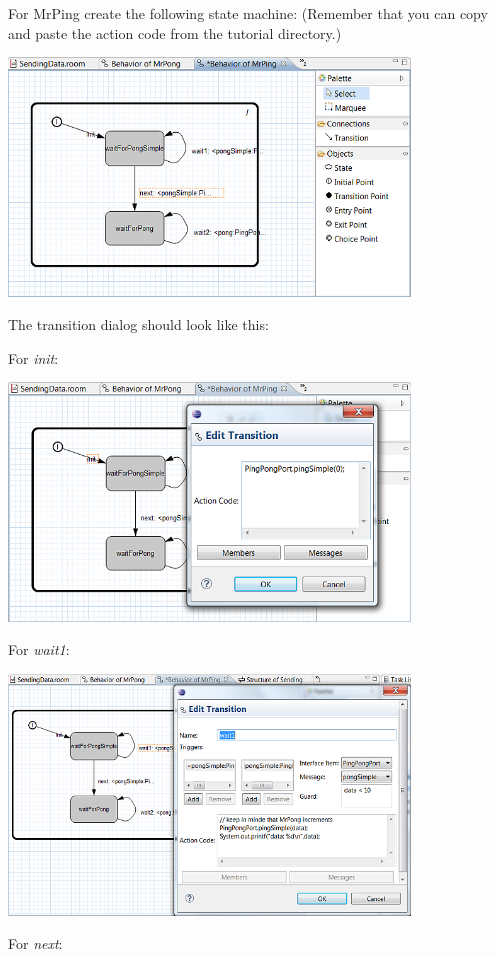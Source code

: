 For MrPing create the following state machine:
(Remember that you can copy and paste the action code from the tutorial directory.)

\includegraphics[width=0.8\textwidth]{images/025-SendingData08.png}

The transition dialog should look like this:

For \textit{init}:

\includegraphics[width=0.8\textwidth]{images/025-SendingData09.png}

For \textit{wait1}:

\includegraphics[width=0.8\textwidth]{images/025-SendingData10.png}

For \textit{next}:


